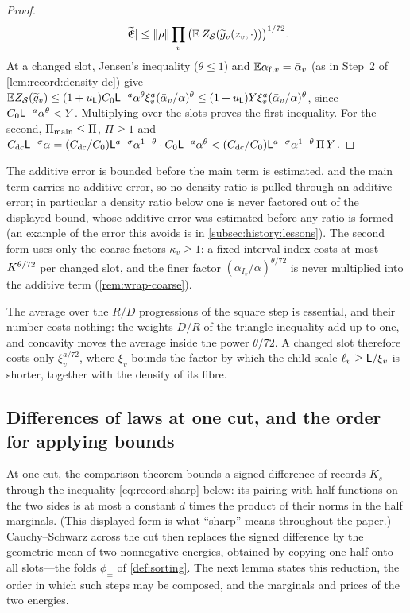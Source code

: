 \begin{proof}
\[
 |\widetilde{\mathfrak E}|\le\|\rho\|\prod_v\big(\mathbb E\,Z_{\mathcal S}
 (\widetilde g_v(z_v,\cdot))\big)^{1/72}.
\]
At a changed slot, Jensen's inequality ($\theta\le1$) and
$\mathbb E\alpha_{{\rm f},v}=\bar\alpha_v$ (as in Step~2 of
\cref{lem:record:density-dc}) give $\mathbb E Z_{\mathcal S}(\widetilde g_v)\le
(1+u_\mathsf L)C_0\mathsf L^{-a}\alpha^\theta\xi_v^a(\bar\alpha_v/\alpha)^\theta\le
(1+u_\mathsf L)Y\xi_v^a(\bar\alpha_v/\alpha)^\theta$, since
$C_0\mathsf L^{-a}\alpha^\theta<Y$. Multiplying over the slots proves the first
inequality. For the second, $\Pi_{\rm main}\le\Pi$, $\Pi\ge1$ and
$C_{\rm dc}\mathsf L^{-\sigma}\alpha=(C_{\rm dc}/C_0)\mathsf L^{a-\sigma}\alpha^{1-\theta}
\cdot C_0\mathsf L^{-a}\alpha^\theta<(C_{\rm dc}/C_0)\mathsf L^{a-\sigma}
\alpha^{1-\theta}\,\Pi\,Y$.
\end{proof}

The additive error is bounded before the main term is estimated, and the
main term carries no additive error, so no density ratio is pulled through
an additive error; in particular a density ratio below one is
never factored out of the displayed bound, whose additive error
was estimated before any ratio is formed (an example of the
error this avoids is in \cref{subsec:history:lessons}). The
second form uses only the coarse factors $\kappa_v\ge1$: a fixed interval
index costs at most $K^{\theta/72}$ per changed slot, and the finer
factor $(\alpha_{I_v}/\alpha)^{\theta/72}$ is never multiplied into the
additive term (\cref{rem:wrap-coarse}).

The average over the $R/D$ progressions of the square step is essential, and
their number costs nothing: the weights $D/R$ of the triangle inequality add
up to one, and concavity moves the average inside the power $\theta/72$. A
changed slot therefore costs only $\xi_v^{a/72}$, where $\xi_v$ bounds the
factor by which the child scale $\ell_v\ge\mathsf L/\xi_v$ is shorter, together
with the density of its fibre.

\subsection{Differences of laws at one cut, and the order for applying bounds}\label{subsec:scale:folded}

At one cut, the comparison theorem bounds a signed difference of
records $K_s$ through the inequality \eqref{eq:record:sharp}
below: its pairing with half-functions on the two sides is at most
a constant $d$ times the product of their norms in the half
marginals. (This displayed form is what ``sharp'' means throughout
the paper.) Cauchy--Schwarz across the cut then replaces the
signed difference by the geometric mean of two nonnegative
energies, obtained by copying one half onto all slots---the folds
$\phi_\pm$ of \cref{def:sorting}. The next lemma states this
reduction, the order in which such steps may be composed, and the
marginals and prices of the two energies.

